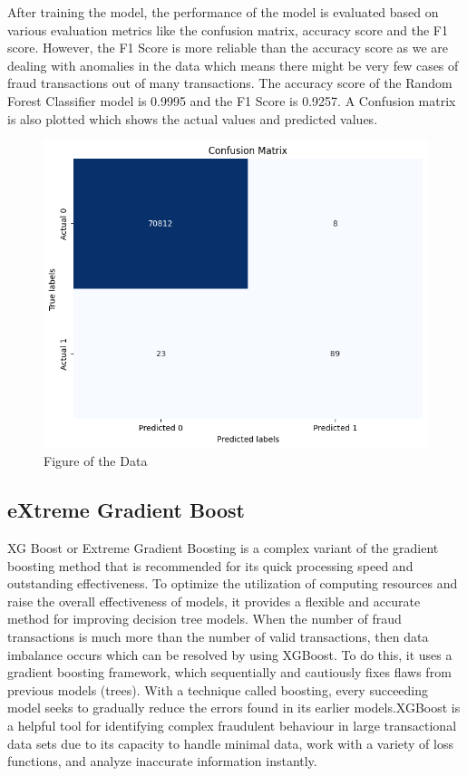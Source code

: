  After training the model, the performance of the model is evaluated based on various evaluation metrics like the confusion matrix, accuracy score and the F1 score. However, the F1 Score is more reliable than the accuracy score as we are dealing with anomalies in the data which means there might be very few cases of fraud transactions out of many transactions. The accuracy score of the Random Forest Classifier model is 0.9995 and the F1 Score is 0.9257. A Confusion matrix is also plotted which shows the actual values and predicted values.


 \begin{figure}[ht]
    \centering
    \includegraphics[scale=0.7]{figures/CM_RandomForest.png}
    \caption{Figure of the Data}
    \label{fig:Plot of the Data}
\end{figure}



 \subsection{eXtreme Gradient Boost }

 XG Boost or Extreme Gradient Boosting is a complex variant of the gradient boosting method that is recommended for its quick processing speed and outstanding effectiveness. To optimize the utilization of computing resources and raise the overall effectiveness of models, it provides a flexible and accurate method for improving decision tree models. When the number of fraud transactions is much more than the number of valid transactions, then data imbalance occurs which can be resolved by using XGBoost. To do this, it uses a gradient boosting framework, which sequentially and cautiously fixes flaws from previous models (trees). With a technique called boosting, every succeeding model seeks to gradually reduce the errors found in its earlier models.XGBoost is a helpful tool for identifying complex fraudulent behaviour in large transactional data sets due to its capacity to handle minimal data, work with a variety of loss functions, and analyze inaccurate information instantly. 


